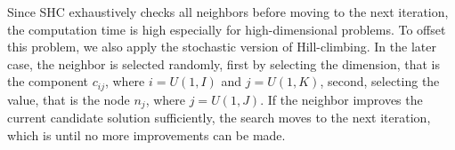 Since SHC exhaustively checks all neighbors before moving to the next iteration, the computation time is high especially for high-dimensional problems. To offset this problem, we also apply the stochastic version of Hill-climbing. In the later case, the neighbor is selected randomly, first by selecting the dimension, that is the component $c_{ij}$, where $i=U(1,I)$ and $j=U(1,K)$, second, selecting the value, that is the node $n_j$, where $j=U(1,J)$. If the neighbor improves the current candidate solution sufficiently, the search moves to the next iteration, which is until no more improvements can be made.

